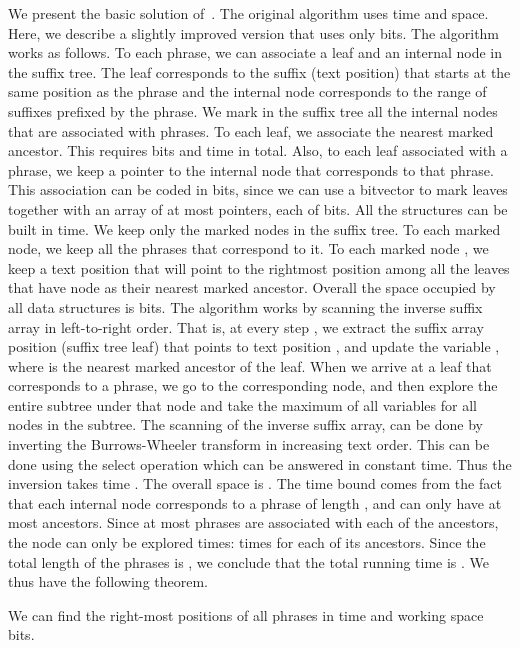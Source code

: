 \documentclass[11pt,runningheads]{llncs}
\begin{document}
{We present the basic solution of~\cite{fnv2013}. 
The original algorithm uses  time and 
 space. Here, we describe a slightly improved 
version that uses only  bits. 
The algorithm works as follows. To each phrase, we can associate a leaf 
and an internal node in the suffix tree. 
The leaf corresponds to the suffix (text position) that starts at the same 
position as the phrase and the internal node corresponds to the 
range of suffixes prefixed by the phrase. We mark in the suffix 
tree all the internal nodes that are associated with phrases. 
To each leaf, we associate the nearest marked ancestor. This requires  bits 
and  time in total. Also, to each leaf associated with a phrase, we keep a pointer 
to the internal node that corresponds to that phrase. This association can be 
coded in  bits, since we can use a bitvector to 
mark leaves together with an array of at most 
pointers, each of  bits. All the structures can be built 
in  time. 
We keep only the marked nodes in the suffix tree. To each 
marked node, we keep all the phrases that correspond to it. 
To each marked node , we keep a text position 
that will point to the rightmost position among all the leaves that 
have node  as their nearest marked ancestor. 
Overall the space occupied by all data structures is 
bits. The algorithm works by scanning the inverse suffix array
in left-to-right order. That is, at every step , we extract the 
suffix array position (suffix tree leaf) that points to text position ,
and update the variable , where  is the nearest marked ancestor 
of the leaf. When we arrive at a leaf that corresponds to a phrase,  
we go to the corresponding node, and then explore the entire subtree under that 
node and take the maximum of all variables  for all nodes 
in the subtree. The scanning of the inverse suffix array, can be done 
by inverting the Burrows-Wheeler transform in increasing text order. 
This can be done using the select operation which can be answered 
in constant time. Thus the inversion takes time . 
The overall space is . 
The time bound comes from the 
fact that each internal node corresponds to a phrase of length , and can only 
have at most  ancestors. Since at most  phrases are associated with each 
of the ancestors, the node can only be explored  times:  times 
for each of its  ancestors. Since the total length of the phrases is , 
we conclude that the total running time is . 
We thus have the following theorem.

\begin{theorem}
We can find the right-most positions of all phrases in time 
and working space  bits. 
\end{theorem}


}
\end{document}
